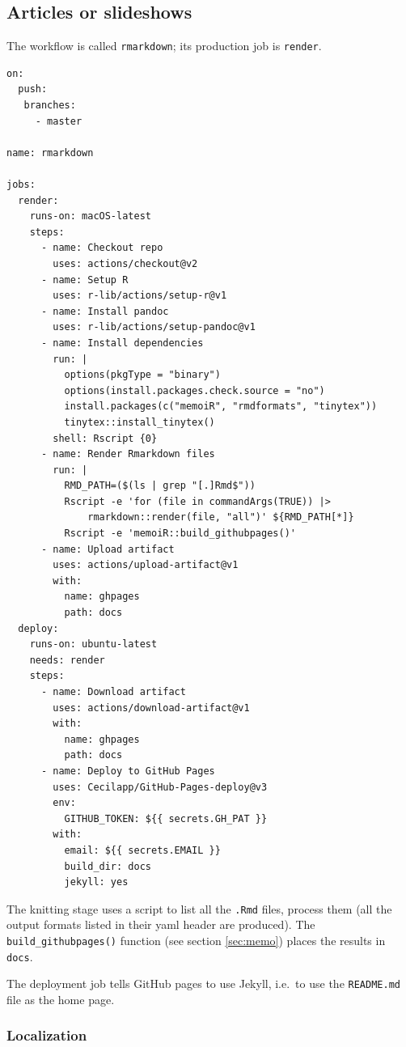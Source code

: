 \documentclass[
  12pt,
  american,
  a4paper,
  extrafontsizes,onecolumn,openright
  ]{memoir}
\begin{document}
\hypertarget{articles-or-slideshows}{%
\subsection{Articles or slideshows}\label{articles-or-slideshows}}

The workflow is called \texttt{rmarkdown}; its production job is \texttt{render}.

\begin{verbatim}
on:
  push:
   branches:
     - master

name: rmarkdown

jobs:
  render:
    runs-on: macOS-latest
    steps:
      - name: Checkout repo
        uses: actions/checkout@v2
      - name: Setup R
        uses: r-lib/actions/setup-r@v1
      - name: Install pandoc
        uses: r-lib/actions/setup-pandoc@v1
      - name: Install dependencies
        run: |
          options(pkgType = "binary")
          options(install.packages.check.source = "no")
          install.packages(c("memoiR", "rmdformats", "tinytex"))
          tinytex::install_tinytex()
        shell: Rscript {0}
      - name: Render Rmarkdown files
        run: |
          RMD_PATH=($(ls | grep "[.]Rmd$"))
          Rscript -e 'for (file in commandArgs(TRUE)) |>
              rmarkdown::render(file, "all")' ${RMD_PATH[*]}
          Rscript -e 'memoiR::build_githubpages()'
      - name: Upload artifact
        uses: actions/upload-artifact@v1
        with:
          name: ghpages
          path: docs
  deploy:
    runs-on: ubuntu-latest
    needs: render
    steps:
      - name: Download artifact
        uses: actions/download-artifact@v1
        with:
          name: ghpages
          path: docs
      - name: Deploy to GitHub Pages
        uses: Cecilapp/GitHub-Pages-deploy@v3
        env:
          GITHUB_TOKEN: ${{ secrets.GH_PAT }}
        with:
          email: ${{ secrets.EMAIL }}
          build_dir: docs
          jekyll: yes
\end{verbatim}

The knitting stage uses a script to list all the \texttt{.Rmd} files, process them (all the output formats listed in their yaml header are produced).
The \texttt{build\_githubpages()} function (see section \ref{sec:memo}) places the results in \texttt{docs}.

The deployment job tells GitHub pages to use Jekyll, i.e.~to use the \texttt{README.md} file as the home page.

\hypertarget{localization}{%
\subsubsection{Localization}\label{localization}}
\end{document}
